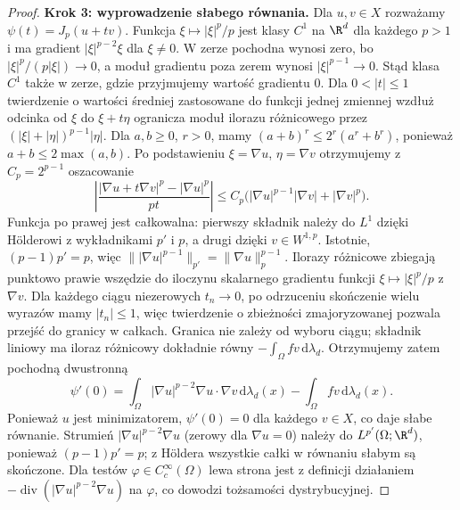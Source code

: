 \begin{proof}
\textbf{Krok 3: wyprowadzenie słabego równania.}
Dla $u,v\in X$ rozważamy $\psi(t)=J_p(u+tv)$.
Funkcja $\xi\mapsto|\xi|^p/p$ jest klasy $C^1$ na $\R^d$
dla każdego $p>1$ i ma gradient
$|\xi|^{p-2}\xi$ dla $\xi\ne0$.
W zerze pochodna wynosi zero, bo
$|\xi|^p/(p|\xi|)\to0$, a moduł gradientu poza
zerem wynosi $|\xi|^{p-1}\to0$. Stąd klasa $C^1$
także w zerze, gdzie przyjmujemy wartość gradientu $0$.
Dla $0<|t|\le1$ twierdzenie o wartości średniej
zastosowane do funkcji jednej zmiennej wzdłuż odcinka
od $\xi$ do $\xi+t\eta$ ogranicza moduł ilorazu
różnicowego przez $(|\xi|+|\eta|)^{p-1}|\eta|$.
Dla $a,b\ge0$, $r>0$, mamy
$(a+b)^r\le 2^r(a^r+b^r)$, ponieważ
$a+b\le2\max(a,b)$.
Po podstawieniu $\xi=\nabla u$, $\eta=\nabla v$
otrzymujemy z $C_p=2^{p-1}$ oszacowanie
\[
\left|\frac{|\nabla u+t\nabla v|^p-|\nabla u|^p}{pt}\right|
\le C_p\big(|\nabla u|^{p-1}|\nabla v|+|\nabla v|^p\big).
\]
Funkcja po prawej jest całkowalna: pierwszy składnik
należy do $L^1$ dzięki H\"olderowi z wykładnikami
$p'$ i $p$, a drugi dzięki $v\in W^{1,p}$.
Istotnie, $(p-1)p'=p$, więc
$\||\nabla u|^{p-1}\|_{p'}=\|\nabla u\|_p^{p-1}$.
Ilorazy różnicowe zbiegają punktowo prawie wszędzie
do iloczynu skalarnego gradientu funkcji
$\xi\mapsto|\xi|^p/p$ z $\nabla v$.
Dla każdego ciągu niezerowych $t_n\to0$,
po odrzuceniu skończenie wielu wyrazów mamy $|t_n|\le1$,
więc twierdzenie o zbieżności zmajoryzowanej
pozwala przejść do granicy w całkach.
Granica nie zależy od wyboru ciągu; składnik liniowy
ma iloraz różnicowy dokładnie równy
$-\int_\Omega fv\,\mathrm d\lambda_d$.
Otrzymujemy zatem pochodną dwustronną
\[ \psi'(0)=\int_\Omega |\nabla u|^{p-2}\nabla u
\cdot\nabla v\,\mathrm d\lambda_d(x)
-\int_\Omega fv\,\mathrm d\lambda_d(x). \]
Ponieważ $u$ jest minimizatorem, $\psi'(0)=0$
dla każdego $v\in X$, co daje słabe równanie.
Strumień $|\nabla u|^{p-2}\nabla u$ (zerowy dla
$\nabla u=0$) należy do $L^{p'}(\Omega;\R^d)$,
ponieważ $ (p-1)p'=p$; z Höldera wszystkie całki
w równaniu słabym są skończone.
Dla testów $\varphi\in C_c^\infty(\Omega)$
lewa strona jest z definicji działaniem
$-\operatorname{div}(|\nabla u|^{p-2}\nabla u)$
na $\varphi$, co dowodzi tożsamości dystrybucyjnej.


\end{proof}
